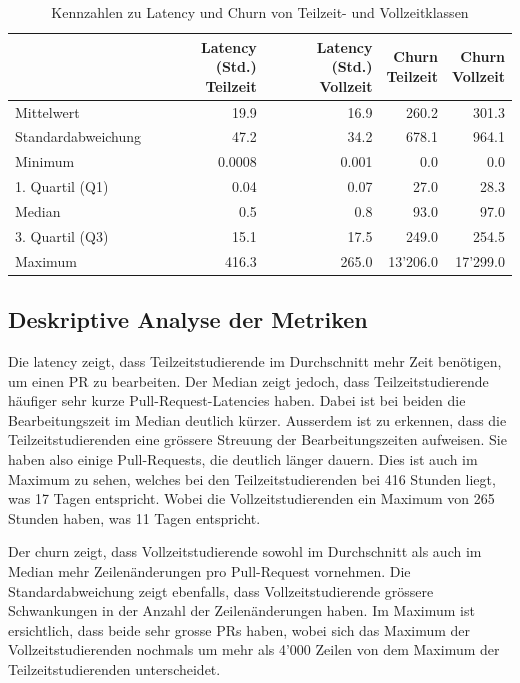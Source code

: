 \begin{table}[htbp]
    \centering
    \caption{Kennzahlen zu Latency und Churn von Teilzeit- und Vollzeitklassen}
    \begin{tabular}{@{}lrrrr@{}}
        \toprule
        \makecell{}&
        \makecell{\textbf{Latency (Std.)} \\ \textbf{Teilzeit}}&
        \makecell{\textbf{Latency (Std.)} \\ \textbf{Vollzeit}}&
        \makecell{\textbf{Churn} \\ \textbf{Teilzeit}}&
        \makecell{\textbf{Churn} \\ \textbf{Vollzeit}}\\
        \midrule
        Mittelwert & 19.9 & 16.9 & 260.2 & 301.3 \\
        Standardabweichung &  47.2 & 34.2  & 678.1 & 964.1 \\
        Minimum & 0.0008 & 0.001 & 0.0 & 0.0 \\
        1. Quartil (Q1) & 0.04 & 0.07 & 27.0 & 28.3\\
        Median & 0.5 & 0.8 & 93.0 & 97.0 \\
        3. Quartil (Q3) &  15.1 & 17.5 & 249.0 & 254.5 \\
        Maximum & 416.3 & 265.0 & 13'206.0 & 17'299.0 \\
        \bottomrule
    \end{tabular}
    \label{tab:deskriptive-kennzahlen-teilzeit-vollzeit}
\end{table}


\subsection{Deskriptive Analyse der Metriken}
Die latency zeigt, dass Teilzeitstudierende im Durchschnitt mehr Zeit benötigen, um einen PR zu bearbeiten. Der Median zeigt jedoch, dass Teilzeitstudierende häufiger sehr kurze Pull-Request-Latencies haben. Dabei ist bei beiden die Bearbeitungszeit im Median deutlich kürzer. Ausserdem ist zu erkennen, dass die Teilzeitstudierenden eine grössere Streuung der Bearbeitungszeiten aufweisen. Sie haben also einige Pull-Requests, die deutlich länger dauern. Dies ist auch im Maximum zu sehen, welches bei den Teilzeitstudierenden bei 416 Stunden liegt, was 17 Tagen entspricht. Wobei die Vollzeitstudierenden ein Maximum von 265 Stunden haben, was 11 Tagen entspricht.

Der churn zeigt, dass Vollzeitstudierende sowohl im Durchschnitt als auch im Median mehr Zeilenänderungen pro Pull-Request vornehmen. Die Standardabweichung zeigt ebenfalls, dass Vollzeitstudierende grössere Schwankungen in der Anzahl der Zeilenänderungen haben. Im Maximum ist ersichtlich, dass beide sehr grosse PRs haben, wobei sich das Maximum der Vollzeitstudierenden nochmals um mehr als 4'000 Zeilen von dem Maximum der Teilzeitstudierenden unterscheidet.

